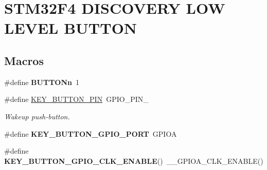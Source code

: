 \hypertarget{group___s_t_m32_f4___d_i_s_c_o_v_e_r_y___l_o_w___l_e_v_e_l___b_u_t_t_o_n}{}\section{S\+T\+M32\+F4 D\+I\+S\+C\+O\+V\+E\+RY L\+OW L\+E\+V\+EL B\+U\+T\+T\+ON}
\label{group___s_t_m32_f4___d_i_s_c_o_v_e_r_y___l_o_w___l_e_v_e_l___b_u_t_t_o_n}
\subsection*{Macros}
\begin{DoxyCompactItemize}
\item 
\mbox{\label{group___s_t_m32_f4___d_i_s_c_o_v_e_r_y___l_o_w___l_e_v_e_l___b_u_t_t_o_n_ga43d47e509ada64329393005c3be15d64}} 
\#define {\bfseries B\+U\+T\+T\+O\+Nn}~1
\item 
\mbox{\label{group___s_t_m32_f4___d_i_s_c_o_v_e_r_y___l_o_w___l_e_v_e_l___b_u_t_t_o_n_ga5c260a4b4e26836dc3a9b6f15d317421}} 
\#define \mbox{\hyperlink{group___s_t_m32_f4___d_i_s_c_o_v_e_r_y___l_o_w___l_e_v_e_l___b_u_t_t_o_n_ga5c260a4b4e26836dc3a9b6f15d317421}{K\+E\+Y\+\_\+\+B\+U\+T\+T\+O\+N\+\_\+\+P\+IN}}~G\+P\+I\+O\+\_\+\+P\+I\+N\+\_
\begin{DoxyCompactList}\small\item\em Wakeup push-\/button. \end{DoxyCompactList}\item 
\mbox{\label{group___s_t_m32_f4___d_i_s_c_o_v_e_r_y___l_o_w___l_e_v_e_l___b_u_t_t_o_n_ga98680733a6992dacef531bfd0c23031c}} 
\#define {\bfseries K\+E\+Y\+\_\+\+B\+U\+T\+T\+O\+N\+\_\+\+G\+P\+I\+O\+\_\+\+P\+O\+RT}~G\+P\+I\+OA
\item 
\mbox{\label{group___s_t_m32_f4___d_i_s_c_o_v_e_r_y___l_o_w___l_e_v_e_l___b_u_t_t_o_n_ga6237d656da42b750f63cbf3e329096d5}} 
\#define {\bfseries K\+E\+Y\+\_\+\+B\+U\+T\+T\+O\+N\+\_\+\+G\+P\+I\+O\+\_\+\+C\+L\+K\+\_\+\+E\+N\+A\+B\+LE}()~\+\_\+\+\_\+\+G\+P\+I\+O\+A\+\_\+\+C\+L\+K\+\_\+\+E\+N\+A\+B\+LE()

\end{DoxyCompactItemize}

